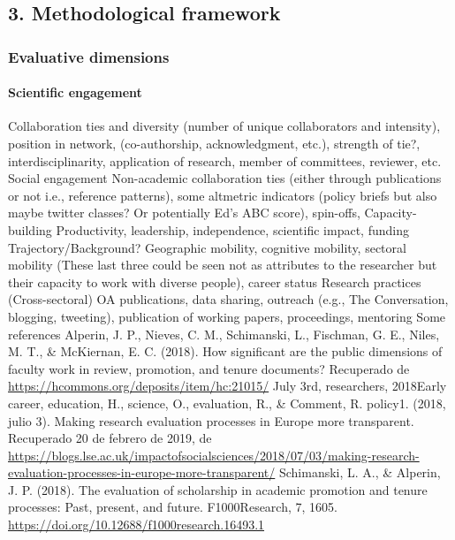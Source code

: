 \documentclass[]{article}
\let\oldparagraph\paragraph
\renewcommand{\paragraph}[1]{\oldparagraph{#1}\mbox{}}
\begin{document}
\subsection{3. Methodological framework}\label{methodological-framework}

\subsubsection{Evaluative dimensions}\label{evaluative-dimensions}

\paragraph{Scientific engagement}\label{scientific-engagement}

Collaboration ties and diversity (number of unique collaborators and
intensity), position in network, (co-authorship, acknowledgment, etc.),
strength of tie?, interdisciplinarity, application of research, member
of committees, reviewer, etc. Social engagement Non-academic
collaboration ties (either through publications or not i.e., reference
patterns), some altmetric indicators (policy briefs but also maybe
twitter classes? Or potentially Ed's ABC score), spin-offs,
Capacity-building Productivity, leadership, independence, scientific
impact, funding Trajectory/Background? Geographic mobility, cognitive
mobility, sectoral mobility (These last three could be seen not as
attributes to the researcher but their capacity to work with diverse
people), career status Research practices (Cross-sectoral) OA
publications, data sharing, outreach (e.g., The Conversation, blogging,
tweeting), publication of working papers, proceedings, mentoring Some
references Alperin, J. P., Nieves, C. M., Schimanski, L., Fischman, G.
E., Niles, M. T., \& McKiernan, E. C. (2018). How significant are the
public dimensions of faculty work in review, promotion, and tenure
documents? Recuperado de
\url{https://hcommons.org/deposits/item/hc:21015/} July 3rd,
researchers, 2018\textbar{}Early career, education, H., science, O.,
evaluation, R., \& Comment, R. policy\textbar{}1. (2018, julio 3).
Making research evaluation processes in Europe more transparent.
Recuperado 20 de febrero de 2019, de
\url{https://blogs.lse.ac.uk/impactofsocialsciences/2018/07/03/making-research-evaluation-processes-in-europe-more-transparent/}
Schimanski, L. A., \& Alperin, J. P. (2018). The evaluation of
scholarship in academic promotion and tenure processes: Past, present,
and future. F1000Research, 7, 1605.
\url{https://doi.org/10.12688/f1000research.16493.1}
\end{document}
